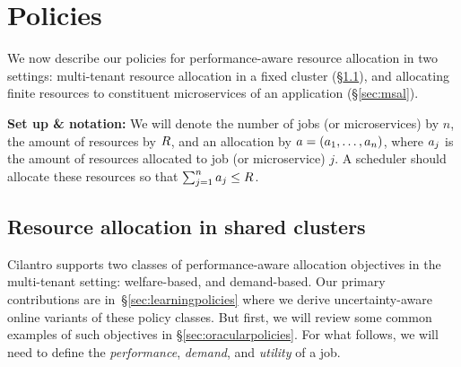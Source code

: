 

\section{Policies}
\label{sec:policies}

We now describe our
policies for performance-aware resource allocation in two settings:
multi-tenant resource allocation in a fixed cluster (\S\ref{sec:polfc}),
and
allocating finite resources to constituent microservices of an application
(\S\ref{sec:msal}).

\textbf{Set up \& notation:}
We will denote the number of jobs (or microservices) by $n$, the amount of resources by $R$,
and an allocation by $a=(a_1,\dots,a_n)$, where $a_{j}$ is the
amount of resources allocated to job (or microservice) $j$.
A scheduler should allocate these resources so that $\sum_{j=1}^n a_{j} \leq R$.


\subsection{Resource allocation in shared clusters}
\label{sec:polfc}



Cilantro supports two classes of performance-aware allocation objectives in the multi-tenant
setting:
welfare-based, and demand-based. 
Our primary contributions are in~\S\ref{sec:learningpolicies} where we derive uncertainty-aware
online variants of these policy classes.
But first, we will review some common examples of such objectives in
\S\ref{sec:oracularpolicies}.
For what follows,
we will need to define the \emph{performance}, \emph{demand}, and \emph{utility} of a job.


